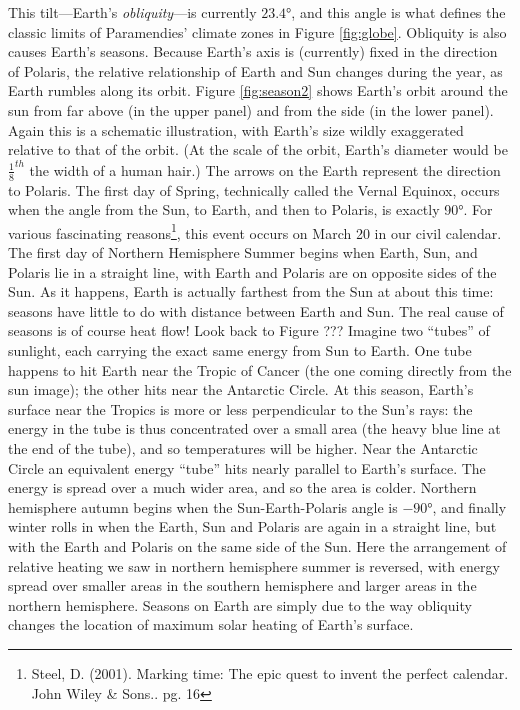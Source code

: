 \documentclass[amstex,12pt]{book}
\begin{document}
This tilt---Earth's \emph{obliquity}---is currently $\ang{23.4}$, and this angle is what defines the classic limits of Paramendies’ climate zones in Figure \ref{fig:globe}. Obliquity is also causes Earth's seasons. Because Earth's axis is (currently) fixed in the direction of Polaris, the relative relationship of Earth and Sun changes during the year, as Earth rumbles along its orbit. Figure \ref{fig:season2} shows Earth's orbit around the sun from far above (in the upper panel) and from the side (in the lower panel). Again this is a schematic illustration, with Earth's size wildly exaggerated relative to that of the orbit. (At the scale of the orbit, Earth's diameter would be $\frac{1}{8}^{th}$ the width of a human hair.) The arrows on the Earth represent the direction to Polaris. The first day of Spring, technically called the Vernal Equinox, occurs when the angle from the Sun, to Earth, and then to Polaris, is exactly \ang{90}. For various fascinating reasons\footnote{Steel, D. (2001). Marking time: The epic quest to invent the perfect calendar. John Wiley \& Sons.. pg. 16}, this event occurs on March 20 in our civil calendar.\\
The first day of Northern Hemisphere Summer begins when Earth, Sun, and Polaris lie in a straight line, with Earth and Polaris are on opposite sides of the Sun. As it happens, Earth is actually farthest from the Sun at about this time: seasons have little to do with distance \label{distance_cite} between Earth and Sun. The real cause of seasons is of course heat flow! Look back to Figure ??? Imagine two ``tubes'' of sunlight, each carrying the exact same energy from Sun to Earth. One tube happens to hit Earth near the Tropic of Cancer (the one coming directly from the sun image); the other hits near the Antarctic Circle. At this season, Earth's surface near the Tropics is more or less perpendicular to the Sun's rays: the energy in the tube is thus concentrated over a small area (the heavy blue line at the end of the tube), and so temperatures will be higher. Near the Antarctic Circle an equivalent energy ``tube'' hits nearly parallel to Earth's surface. The energy is spread over a much wider area, and so the area is colder. Northern hemisphere autumn begins when the Sun-Earth-Polaris angle is $\ang{-90}$, and finally winter rolls in when the Earth, Sun and Polaris are again in a straight line, but with the Earth and Polaris on the same side of the Sun. Here the arrangement of relative heating we saw in northern hemisphere summer is reversed, with energy spread over smaller areas in the southern hemisphere and larger areas in the northern hemisphere. Seasons on Earth are simply due to the way obliquity changes the location of maximum solar heating of Earth's surface.\\
\end{document}
